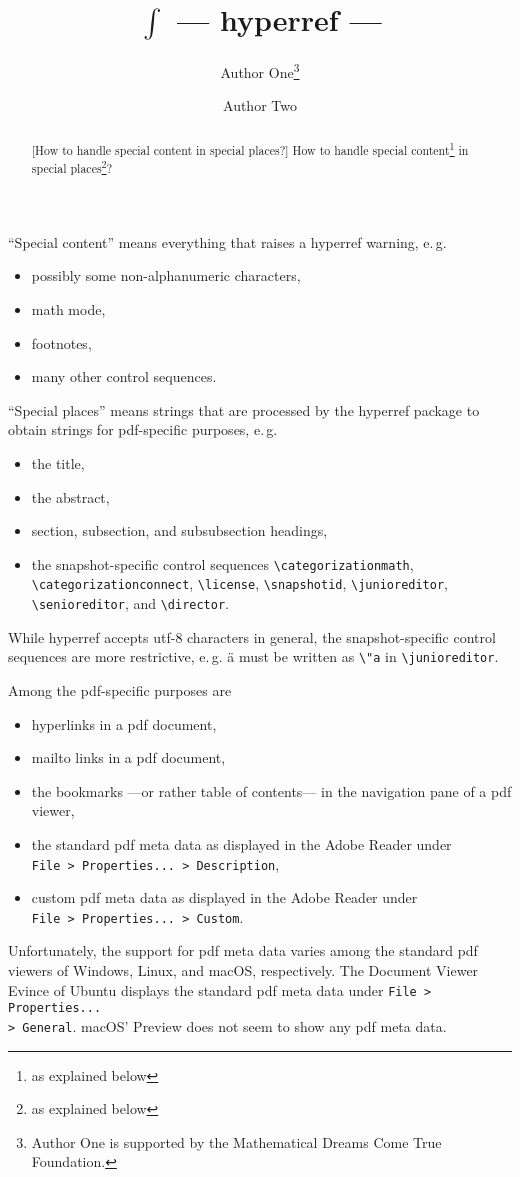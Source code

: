 \documentclass{snapshotmfo}
\author{Author One\thanks{Author One is supported by the Mathematical Dreams Come True Foundation.} \and Author Two}
\title{\texorpdfstring{$\int$ }{}--- hyperref ---\texorpdfstring{ \reflectbox{$\int$}}{}}
\begin{document}
\begin{abstract}[How to handle special content in special places?]
How to handle special content\footnote{as explained below} in special places\footnote{as explained below}?
\end{abstract}

\noindent ``Special content'' means everything that raises a hyperref warning, e.\,g.
\begin{itemize}
  \item possibly some non-alphanumeric characters,
  \item math mode,
  \item footnotes,
  \item many other control sequences.
\end{itemize}

\noindent ``Special places'' means strings that are processed by the hyperref package to obtain strings for pdf-specific purposes, e.\,g. 
\begin{itemize}
  \item the title,
  \item the abstract,
  \item section, subsection, and subsubsection headings,
  \item the snapshot-specific control sequences 
  \verb+\categorizationmath+,\\
  \verb+\categorizationconnect+, 
  \verb+\license+, 
  \verb+\snapshotid+, 
  \verb+\junioreditor+,\\ 
  \verb+\senioreditor+, and 
  \verb+\director+.
\end{itemize}
While hyperref accepts utf-8 characters in general, the snapshot-specific control sequences are more restrictive, e.\,g. ä must be written as \verb+\"a+ in \verb+\junioreditor+.

\noindent Among the pdf-specific purposes are
\begin{itemize}
  \item hyperlinks in a pdf document,
  \item mailto links in a pdf document,
  \item the bookmarks ---or rather table of contents--- in the navigation pane of a pdf viewer,
  \item the standard pdf meta data as displayed in the Adobe Reader under\\ \verb+File > Properties... > Description+,
  \item custom pdf meta data as displayed in the Adobe Reader under\\ \verb+File > Properties... > Custom+.
\end{itemize}
Unfortunately, the support for pdf meta data varies among the standard pdf viewers of Windows, Linux, and macOS, respectively.
The Document Viewer Evince of Ubuntu displays the standard pdf meta data under
\verb+File > Properties...+\\ \verb+> General+.
macOS' Preview does not seem to show any pdf meta data. 
\end{document}
